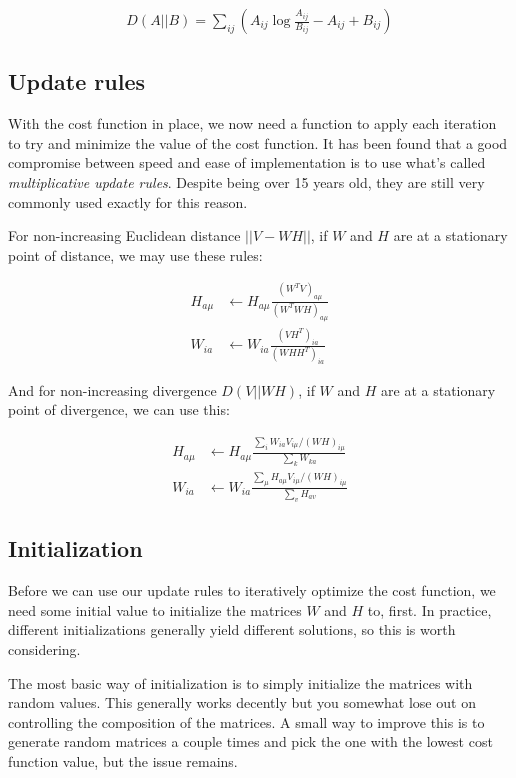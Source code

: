 \begin{align}
D(A||B) = \sum_{ij} \left( A_{ij} \log \frac{A_{ij}}{B_{ij}} - A_{ij} + B_{ij} \right)
\end{align}

\subsection{Update rules}
With the cost function in place, we now need a function to apply each iteration to try and minimize the value of the cost function. It has been found that a good compromise between speed and ease of implementation is to use what's called \emph{multiplicative update rules}. \cite{nmf_algorithms} Despite being over 15 years old, they are still very commonly used exactly for this reason.

For non-increasing Euclidean distance $||V - WH||$, if $W$ and $H$ are at a stationary point of distance, we may use these rules:

\begin{align}
H_{a \mu} & \leftarrow H_{a \mu} \frac{(W^TV)_{a \mu}}{(W^TWH)_{a \mu}} \\
W_{ia} & \leftarrow W_{ia} \frac{(VH^T)_{ia}}{(WHH^T)_{ia}}
\end{align}

And for non-increasing divergence $D(V||WH)$, if $W$ and $H$ are at a stationary point of divergence, we can use this:

\begin{align}
H_{a \mu} & \leftarrow H_{a \mu} \frac{\sum_i W_{ia} V_{i \mu} / (WH)_{i \mu}}{\sum_k W_{ka}} \\
W_{ia} & \leftarrow W_{ia} \frac{\sum_\mu H_{a \mu} V_{i \mu} / (WH)_{i \mu}}{\sum_v H_{av}}
\end{align}

\subsection{Initialization}
Before we can use our update rules to iteratively optimize the cost function, we need some initial value to initialize the matrices $W$ and $H$ to, first. In practice, different initializations generally yield different solutions, so this is worth considering. \cite{naik_2015_nmf_advances}

The most basic way of initialization is to simply initialize the matrices with random values. This generally works decently but you somewhat lose out on controlling the composition of the matrices. A small way to improve this is to generate random matrices a couple times and pick the one with the lowest cost function value, but the issue remains.

